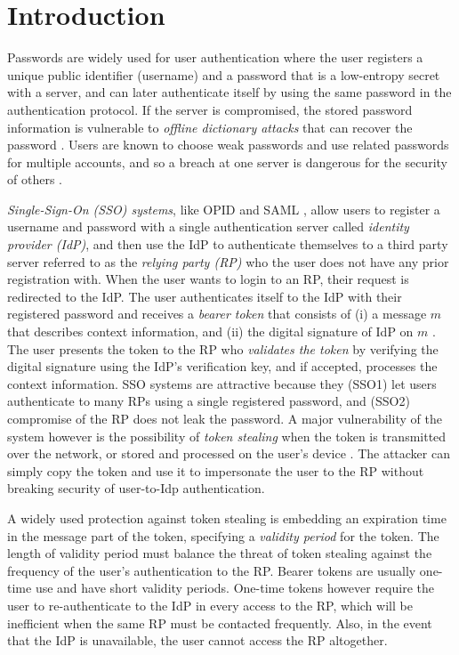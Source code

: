 \documentclass[conference]{IEEEtran}
\begin{document}
\section{Introduction}
Passwords are widely used for user authentication where the user registers a unique public identifier (username) and a password that is a low-entropy
secret with a server, and can later authenticate itself by using the same password in the authentication protocol. If the server is compromised, the stored password information is vulnerable to {\em offline dictionary attacks} that can recover the password \cite{camenisch2015optimal,cryptoeprint:2019/199}.
Users are known to choose weak passwords and use related passwords for multiple accounts, and so a breach at one server is dangerous for the security of others \cite{hanamsagar2018leveraging}.

{\em Single-Sign-On (SSO) systems}, like OPID \cite{openIDConnect} and SAML \cite{SAML}, allow users to register a username and password with a single authentication server called {\em identity provider (IdP)}, and then use the IdP 
to authenticate themselves to a third party server referred to as the {\em relying party (RP)} who the user does not have any prior registration with.
When the user wants to login to an RP,  their request is redirected to the IdP. The user authenticates itself to the IdP with their registered password and receives a {\em bearer token} \cite{rfc6750} 
that consists of (i) a message $m$ that describes context information, and (ii) the digital signature of IdP on $m$ \cite{SAML,jwt-rfc7519}.
The user presents the token to the RP who {\em validates the token} by verifying the digital signature using the IdP's verification key, and if accepted, processes the context information. SSO systems are attractive because they (SSO1) let users authenticate to many RPs using a single registered password, and (SSO2) compromise of the RP does not leak the password. A major vulnerability of the system however is the possibility of {\em token stealing} when the token is transmitted over the network, or stored and processed on the user's device \cite{MicrosoftTokenTheft,GitHubTokenTheft}. The attacker can simply copy the token and use it to impersonate the user to the RP without breaking security of user-to-Idp authentication.

%
A widely used protection against token stealing is embedding an expiration time in the message part of the token, specifying a {\em validity period} for the token. The length of validity period must balance the threat of token stealing against the frequency of the user's authentication to the RP. Bearer tokens are usually one-time use and have short validity periods. One-time tokens however require the user to re-authenticate to the IdP in every access to the RP, which will be inefficient when the same RP must be contacted frequently. Also, in the event that the IdP is unavailable, the user cannot access the RP altogether.
\end{document}
